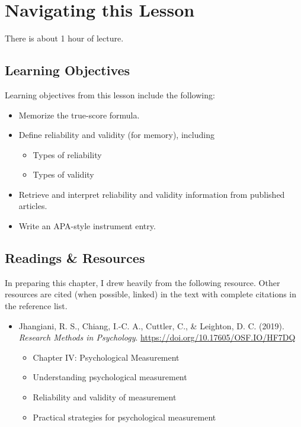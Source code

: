 \documentclass[
  english,
]{book}
\providecommand{\tightlist}{%
  \setlength{\itemsep}{0pt}\setlength{\parskip}{0pt}}
\begin{document}
\hypertarget{navigating-this-lesson-3}{%
\section{Navigating this Lesson}\label{navigating-this-lesson-3}}

There is about 1 hour of lecture.

\hypertarget{learning-objectives-3}{%
\subsection{Learning Objectives}\label{learning-objectives-3}}

Learning objectives from this lesson include the following:

\begin{itemize}
\tightlist
\item
  Memorize the true-score formula.
\item
  Define reliability and validity (for memory), including

  \begin{itemize}
  \tightlist
  \item
    Types of reliability
  \item
    Types of validity
  \end{itemize}
\item
  Retrieve and interpret reliability and validity information from published articles.
\item
  Write an APA-style instrument entry.
\end{itemize}

\hypertarget{readings-resources-3}{%
\subsection{Readings \& Resources}\label{readings-resources-3}}

In preparing this chapter, I drew heavily from the following resource. Other resources are cited (when possible, linked) in the text with complete citations in the reference list.

\begin{itemize}
\tightlist
\item
  Jhangiani, R. S., Chiang, I.-C. A., Cuttler, C., \& Leighton, D. C. (2019). \emph{Research Methods in Psychology}. \url{https://doi.org/10.17605/OSF.IO/HF7DQ}

  \begin{itemize}
  \tightlist
  \item
    Chapter IV: Psychological Measurement
  \item
    Understanding psychological measurement
  \item
    Reliability and validity of measurement
  \item
    Practical strategies for psychological measurement
  \end{itemize}
\end{itemize}
\end{document}
